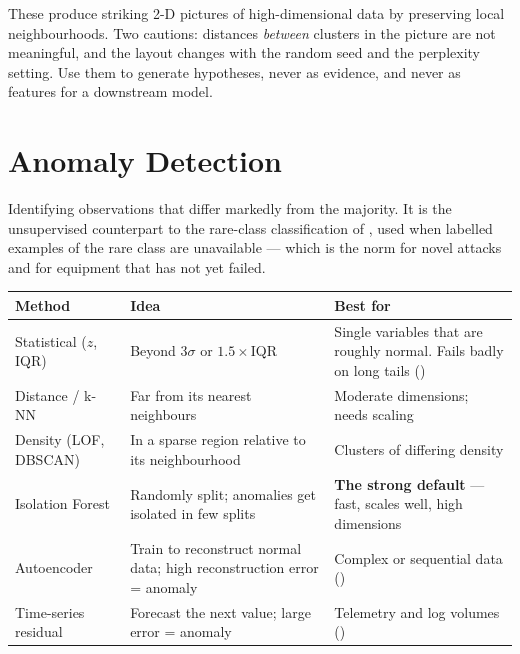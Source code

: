 \begin{conceptbox}
These produce striking 2-D pictures of high-dimensional data by preserving local
neighbourhoods. Two cautions: distances \emph{between} clusters in the picture are
not meaningful, and the layout changes with the random seed and the perplexity
setting. Use them to generate hypotheses, never as evidence, and never as features
for a downstream model.
\end{conceptbox}

\section{Anomaly Detection}

\begin{definitionbox}
Identifying observations that differ markedly from the majority. It is the
unsupervised counterpart to the rare-class classification of ,
used when labelled examples of the rare class are unavailable --- which is the norm
for novel attacks and for equipment that has not yet failed.
\end{definitionbox}

\begin{longtable}{@{}L{3.2cm}L{5.0cm}L{6.0cm}@{}}
\toprule
{}
\textbf{Method} & \textbf{Idea} & \textbf{Best for} \\
\midrule
\endhead
Statistical ($z$, IQR) & Beyond $3\sigma$ or $1.5\times$IQR & Single variables that are roughly normal. Fails badly on long tails () \\
Distance / k-NN & Far from its nearest neighbours & Moderate dimensions; needs scaling \\
Density (LOF, DBSCAN) & In a sparse region relative to its neighbourhood & Clusters of differing density \\
Isolation Forest & Randomly split; anomalies get isolated in few splits & \textbf{The strong default} --- fast, scales well, high dimensions \\
Autoencoder & Train to reconstruct normal data; high reconstruction error = anomaly & Complex or sequential data () \\
Time-series residual & Forecast the next value; large error = anomaly & Telemetry and log volumes () \\
\bottomrule
\end{longtable}

